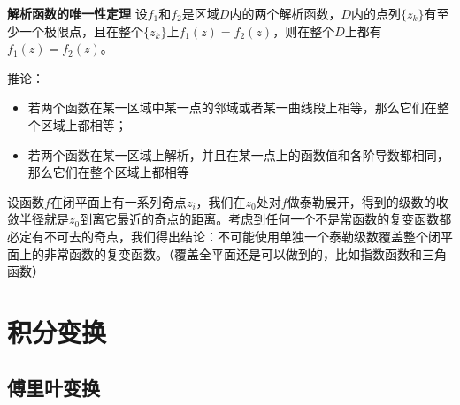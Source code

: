 \documentclass[UTF8]{ctexart}
\begin{document}
\textbf{解析函数的唯一性定理}
设$f_1$和$f_2$是区域$D$内的两个解析函数，$D$内的点列$\{z_k\}$有至少一个极限点，且在整个$\{z_k\}$上$f_1(z)=f_2(z)$，则在整个$D$上都有$f_1(z)=f_2(z)$。

推论： 
\begin{itemize}
    \item 若两个函数在某一区域中某一点的邻域或者某一曲线段上相等，那么它们在整个区域上都相等；
    \item 若两个函数在某一区域上解析，并且在某一点上的函数值和各阶导数都相同，那么它们在整个区域上都相等
\end{itemize}

设函数$f$在闭平面上有一系列奇点$z_i$，我们在$z_0$处对$f$做泰勒展开，得到的级数的收敛半径就是$z_0$到离它最近的奇点的距离。考虑到任何一个不是常函数的复变函数都必定有不可去的奇点，我们得出结论：不可能使用单独一个泰勒级数覆盖整个闭平面上的非常函数的复变函数。（覆盖全平面还是可以做到的，比如指数函数和三角函数）

\hypertarget{ux79efux5206ux53d8ux6362}{%
\section{积分变换}\label{ux79efux5206ux53d8ux6362}}

\hypertarget{ux5085ux91ccux53f6ux53d8ux6362}{%
\subsection{傅里叶变换}\label{ux5085ux91ccux53f6ux53d8ux6362}}
\end{document}

